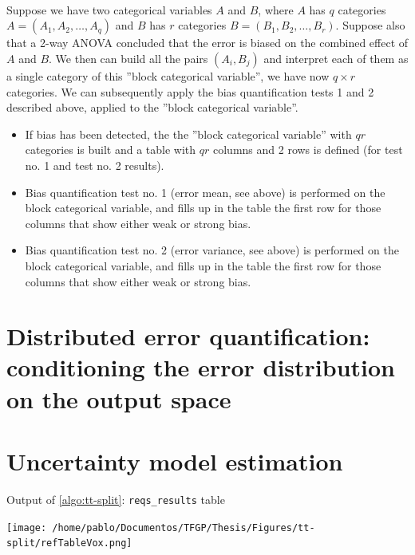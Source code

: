 \paragraph{ \\}
Suppose we have two categorical variables $A$ and $B$, where $A$ has $q$ categories $A=(A_1,A_2,\dots,A_q)$ and $B$ has $r$ categories $B=(B_1,B_2,\dots,B_r)$. Suppose also that a 2-way ANOVA concluded that the error is biased on the combined effect of $A$ and $B$. We then can build all the pairs $(A_i,B_j)$ and interpret each of them as a single category of this ''block categorical variable'', \ie we have now $q \times r$ categories. We can subsequently apply the bias quantification tests 1 and 2 described above, applied to the ''block categorical variable''.\\
\begin{itemize}
	\item If bias has been detected, the the ''block categorical variable'' with $qr$ categories is built and a table with $qr$ columns and 2 rows is defined (for test no. 1 and test no. 2 results).
	\item Bias quantification test no. 1 (error mean, see above) is performed on the block categorical variable, and fills up in the table the first row for those columns that show either weak or strong bias.
	\item Bias quantification test no. 2 (error variance, see above) is performed on the block categorical variable, and fills up in the table the first row for those columns that show either weak or strong bias.
\end{itemize}
\clearpage
\mbox{}
\clearpage
\section{Distributed error quantification: conditioning the error distribution on the output space}\label{sec:biasoutput}
%
\clearpage
\section{Uncertainty model estimation}\label{sec:uncertainty}
%







\clearpage
\begin{table}[htbp]
	\newlength{\voxrefw}
	\edef\tabvoxrefw{\fpeval{\voxrefw*\tabscale}}
	\begin{minipage}{\dimexpr\tabvoxrefw pt\relax}
		\centering
		\caption{Output of \autoref{algo:tt-split}: \texttt{reqs\_results} table}
		\texttt{[image: /home/pablo/Documentos/TFGP/Thesis/Figures/tt-split/refTableVox.png]}
	\end{minipage}
\end{table}


